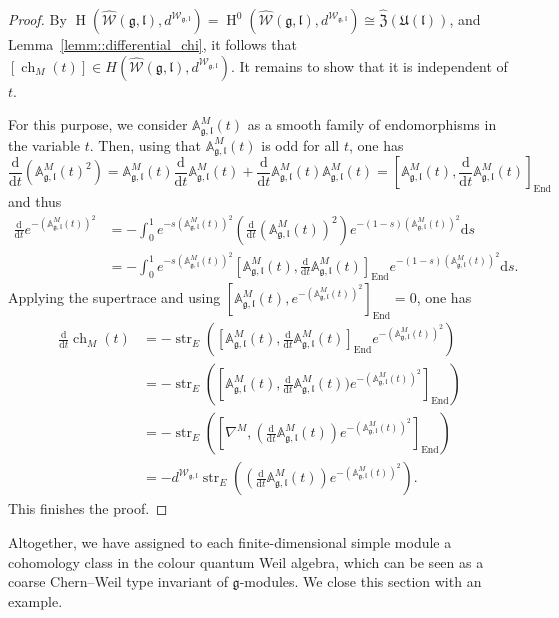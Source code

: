 \documentclass[11pt]{amsart}
\newcommand{\str}{\operatorname{str}}
\newcommand{\End}{\operatorname{End}}
\def\H{{\operatorname{H}}}
\def\ll{{\mathfrak l}}
\def \AA {{\mathbb{A}}}
\def\gg{{\mathfrak{g}}}
\theoremstyle{plain}
\theoremstyle{remark}
\theoremstyle{definition}
\numberwithin{equation}{section}
\theoremstyle{remark}
\begin{document}
\begin{proof}
 By $\H(\widehat{\mathcal{W}}(\gg,\ll), d^{\mathcal{W}_{\gg,\ll}})=\H^{0}(\widehat{\mathcal{W}}(\gg,\ll), d^{\mathcal{W}_{\gg,\ll}})\cong \widehat{\mathfrak{Z}}(\mathfrak{U}(\ll))$, and Lemma~\ref{lemm::differential_chi}, it follows that $[\operatorname{ch}_{M}(t)] \in H(\widehat{\mathcal{W}}(\gg,\ll), d^{\mathcal{W}_{\gg,\ll}})$. It remains to show that it is independent of $t$. 
 
For this purpose, we consider $\AA^{\!M}_{\gg,\ll}(t)$ as a smooth family of endomorphisms in the variable $t$. Then, using that $\AA^{\!M}_{\gg,\ll}(t)$ is odd for all $t$, one has
 \[
 \frac{\mathrm{d}}{\mathrm{d}t}(\AA_{\gg,\ll}^{M}(t)^{2})=\AA_{\gg,\ll}^{M}(t)\frac{\mathrm{d}}{\mathrm{d}t}\AA_{\gg,\ll}^{M}(t)+\frac{\mathrm{d}}{\mathrm{d}t}\AA_{\gg,\ll}^{M}(t) \AA_{\gg,\ll}^{M}(t)=[\AA_{\gg,\ll}^{M}(t), \frac{\mathrm{d}}{\mathrm{d}t}\AA_{\gg,\ll}^{M}(t)]_{\End}
 \]
 and thus
 \[
 \begin{aligned}
 \frac{\mathrm{d}}{\mathrm{d}t} e^{-(\AA_{\gg,\ll}^{M}(t))^{2}} &=- \int_{0}^{1} e^{-s(\AA_{\gg,\ll}^{M}(t))^{2}}(\frac{\mathrm{d}}{\mathrm{d}t} (\AA_{\gg,\ll}^{M}(t))^{2})e^{-(1-s)(\AA_{\gg,\ll}^{M}(t))^{2}} \mathrm{d}s \\ &=- \int_{0}^{1} e^{-s(\AA_{\gg,\ll}^{M}(t))^{2}}[\AA_{\gg,\ll}^{M}(t),\frac{\mathrm{d}}{\mathrm{d}t}\AA_{\gg,\ll}^{M}(t)]_{\End}e^{-(1-s)(\AA_{\gg,\ll}^{M}(t))^{2}} \mathrm{d}s.
 \end{aligned}
 \]
Applying the supertrace and using $[\AA_{\gg,\ll}^{M}(t), e^{-(\AA_{\gg,\ll}^{M}(t))^{2}}]_{\End}=0$, one has
\[
\begin{aligned}
 \frac{\mathrm{d}}{\mathrm{d}t} \operatorname{ch}_{M}(t) &=- \str_{E}([\AA_{\gg,\ll}^{M}(t), \frac{\mathrm{d}}{\mathrm{d}t}\AA_{\gg,\ll}^{M}(t)]_{\End}e^{-(\AA_{\gg,\ll}^{M}(t))^{2}}) \\ &=- \str_{E}([\AA_{\gg,\ll}^{M}(t),\frac{\mathrm{d}}{\mathrm{d}t}\AA_{\gg,\ll}^{M}(t))e^{-(\AA_{\gg,\ll}^{M}(t))^{2}}]_{\End}) \\ &=-\str_{E}([\nabla^{M},(\frac{\mathrm{d}}{\mathrm{d}t}\AA_{\gg,\ll}^{M}(t))e^{-(\AA_{\gg,\ll}^{M}(t))^{2}}]_{\End}) \\ &=-d^{\mathcal{W}_{\gg,\ll}} \str_{E}((\frac{\mathrm{d}}{\mathrm{d}t}\AA_{\gg,\ll}^{M}(t))e^{-(\AA_{\gg,\ll}^{M}(t))^{2}}). 
\end{aligned}
\]
This finishes the proof.
\end{proof}

Altogether, we have assigned to each finite-dimensional simple module a cohomology class in the colour quantum Weil algebra, which can be seen as a coarse Chern--Weil type invariant of $\gg$-modules. We close this section with an example.
\end{document}

